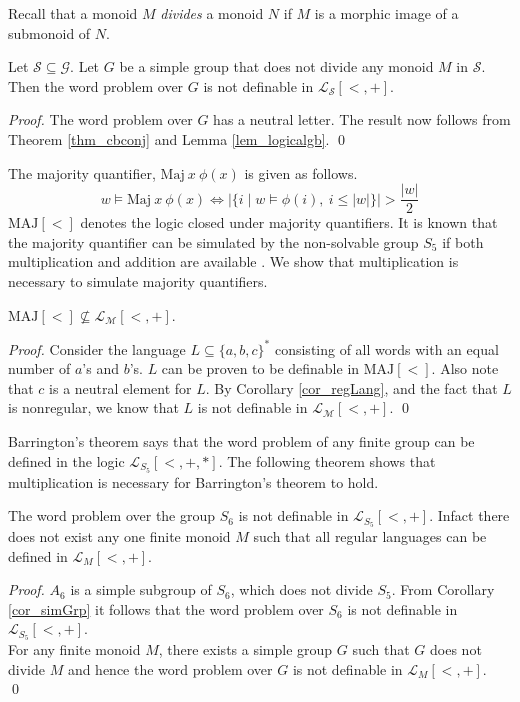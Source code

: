 \documentclass[envcountsame]{llncs}
\newcommand{\MAJ}{\mathrm{MAJ}}
\begin{document}
Recall that a monoid $M$ \emph{divides} a monoid $N$ if $M$ is a morphic image of a submonoid of $N$.

\begin{corollary}
  \label{cor_simGrp}
Let $\mathcal{S \subseteq G}$. Let $G$ be a simple group that does not divide any monoid $M$ in $\mathcal{S}$. Then the word problem over $G$ is not definable in $\mathcal{L_S}[<,+]$.
\end{corollary}
\begin{proof}
The word problem over $G$ has a neutral letter. The result now follows from Theorem \ref{thm_cbconj} and Lemma \ref{lem_logicalgb}.
\qed \end{proof}



The majority quantifier, $\mathrm{Maj} ~x ~\phi(x)$ is given as follows.
$$w \vDash \mathrm{Maj} ~x ~\phi(x) \Leftrightarrow |\{i \mid w \vDash \phi(i), ~i \leq |w| \}|>\frac{|w|}{2}$$
$\MAJ[<]$  denotes the logic closed under majority quantifiers.
It is known that the majority quantifier can be simulated by the non-solvable group $S_5$ if both multiplication and addition are available \cite{vollmer_book}. We show that multiplication is necessary to simulate majority quantifiers.
\begin{corollary}
$\MAJ[<] \nsubseteq \mathcal{L_M}[<,+]$.
\end{corollary}
\begin{proof}
 Consider the language $L \subseteq \{a,b,c\}^*$ consisting of all words with an equal number of $a$'s and $b$'s. $L$ can be proven to be definable in $\MAJ[<]$. Also note that $c$ is a neutral element for $L$. By Corollary \ref{cor_regLang}, and the fact that $L$ is nonregular,  we know that $L$ is not definable in $\mathcal{L_M}[<,+]$.
\qed \end{proof}

Barrington's theorem \cite{barr_NC1} says that the word problem of any finite group can be defined in the logic $\mathcal{L}_{S_5}[<,+,*]$. The following theorem shows that multiplication is necessary for Barrington's theorem to hold.
\begin{corollary}
  The word problem over the group $S_6$ is not definable in $\mathcal{L}_{S_5}[<,+]$. Infact there does not exist any one finite monoid $M$
  such that all regular languages can be defined in $\mathcal{L}_M[<,+]$.
\end{corollary}
\begin{proof}
  $A_6$ is a simple subgroup of $S_6$, which does not divide $S_5$. From Corollary \ref{cor_simGrp} it follows that the word problem over
  $S_6$ is not definable in $\mathcal{L}_{S_5}[<,+]$. \\
  For any finite monoid $M$, there exists a simple group $G$ such that $G$ does not divide $M$ and hence the word problem over $G$ is
  not definable in $\mathcal{L}_M[<,+]$.
\qed \end{proof}
\end{document}

